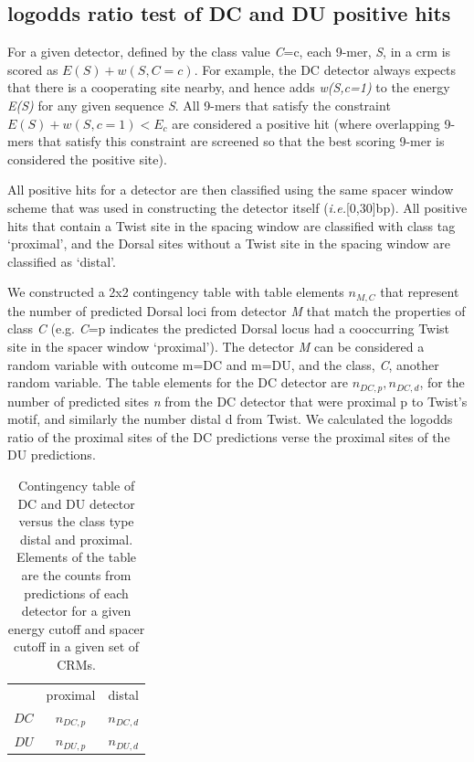 \subsection{logodds ratio test of DC and DU positive hits} 
 For a given detector, defined by the class value \textit{C}=c, each 9-mer, \textit{S}, in a crm is scored as $E(S)+w(S,C=c)$.  For example, the DC detector always expects that there is a cooperating site nearby, and hence adds \textit{w(S,c=1)} to the energy \textit{E(S)} for any given sequence \textit{S}.  All 9-mers that satisfy the constraint $E(S) + w(S,c=1) < E_c$ are considered a positive hit (where overlapping 9-mers that satisfy this constraint are screened so that the best scoring 9-mer is considered the positive site).

All positive hits for a detector are then classified using the same spacer window scheme that was used in constructing the detector itself (\textit{i.e.}[0,30]bp).  All positive hits that contain a Twist site in the spacing window are classified with class tag `proximal', and the Dorsal sites without a Twist site in the spacing window are classified as `distal'.

We constructed a 2x2 contingency table with table elements $n_{M,C}$ that represent the number of predicted Dorsal loci from detector \textit{M} that match the properties of class \textit{C} (e.g. \textit{C}=p indicates the predicted Dorsal locus had a cooccurring Twist site in the spacer window `proximal'). The detector \textit{M} can be considered a random variable with outcome m=DC and m=DU, and the class, \textit{C}, another random variable.  The table elements for the DC detector are $n_{DC,p},n_{DC,d}$, for the number of predicted sites \textit{n} from the DC detector that were proximal p to Twist's motif, and similarly the number distal d from Twist.  We calculated the logodds ratio of the proximal sites of the DC predictions verse the proximal sites of the DU predictions.

\begin{table}[h]
\centering
  \begin{tabular}{ r|c|c| }
\multicolumn{1}{r}{}
 &  \multicolumn{1}{c}{proximal}
 & \multicolumn{1}{c}{distal} \\
\cline{2-3}
$DC$ & $n_{DC,p}$ &  $n_{DC,d}$ \\
\cline{2-3}
$DU$ &  $n_{DU,p}$ & $n_{DU,d}$ \\
\cline{2-3}
\end{tabular}
\caption{Contingency table of DC and DU detector versus the class type distal and proximal.  Elements of the table are the counts from predictions of each detector for a given energy cutoff and spacer cutoff in a given set of CRMs.}\label{tabless3s}
\end{table}


